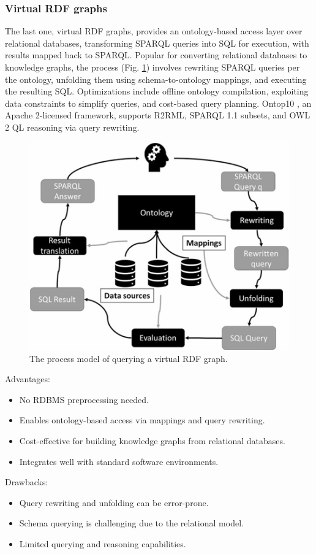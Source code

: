\documentclass[12pt]{article}
\begin{document}
\subsubsection{Virtual RDF graphs}
The last one, virtual RDF graphs, provides an ontology-based access layer over relational databases, transforming SPARQL queries into SQL for execution, with results mapped back to SPARQL. Popular for converting relational databases to knowledge graphs, the process (Fig. \ref{fig:VirtualRDFgraphsalgorithm}) involves rewriting SPARQL queries per the ontology, unfolding them using schema-to-ontology mappings, and executing the resulting SQL. Optimizations include offline ontology compilation, exploiting data constraints to simplify queries, and cost-based query planning. Ontop10 \cite{10.1007/978-3-030-62466-8_17}, an Apache 2-licensed framework, supports R2RML, SPARQL 1.1 subsets, and OWL 2 QL reasoning via query rewriting.
\begin{figure}
    \includegraphics[width=\linewidth]{imgs/Virtual RDF graphs algorithm.jpeg}
    \caption{The process model of querying a virtual RDF graph.}
    \label{fig:VirtualRDFgraphsalgorithm}
\end{figure}
\begin{multicols}{2}
    Advantages:
    \begin{itemize}
        \item No RDBMS preprocessing needed.
        \item Enables ontology-based access via mappings and query rewriting.
        \item Cost-effective for building knowledge graphs from relational databases.
        \item Integrates well with standard software environments.
    \end{itemize}
    \columnbreak
    Drawbacks:
    \begin{itemize}
        \item Query rewriting and unfolding can be error-prone.
        \item Schema querying is challenging due to the relational model.
        \item Limited querying and reasoning capabilities.
    \end{itemize}
\end{multicols}
\end{document}
